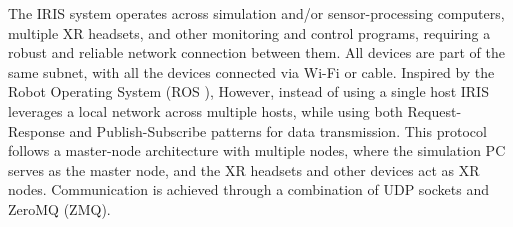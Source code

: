 
The IRIS system operates across simulation and/or sensor-processing computers, multiple XR headsets, and other monitoring and control programs, requiring a robust and reliable network connection between them.
All devices are part of the same subnet, with all the devices connected via Wi-Fi or cable.
Inspired by the Robot Operating System (ROS \cite{quigley2009ros}), 
However, instead of using a single host IRIS leverages a local network across multiple hosts, 
while using both Request-Response and Publish-Subscribe patterns for data transmission.
This protocol follows a master-node architecture with multiple nodes, where the simulation PC serves as the master node, and the XR headsets and other devices act as XR nodes.
Communication is achieved through a combination of UDP sockets and ZeroMQ (ZMQ).


